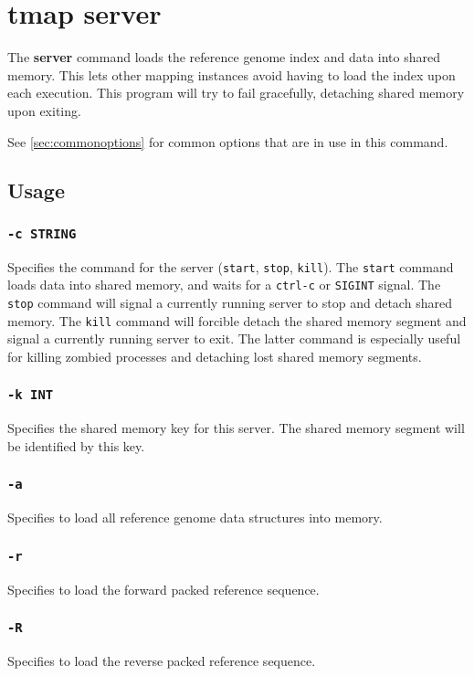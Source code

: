 \documentclass[a4paper,12pt]{book}
\newcommand{\TT}[1]{{\tt #1}} %
\newcommand{\BF}[1]{{\bf #1}} %
\begin{document}
\section{tmap server}
\label{sec:server}
The \BF{server} command loads the reference genome index and data into shared memory.
This lets other mapping instances avoid having to load the index upon each execution.
This program will try to fail gracefully, detaching shared memory upon exiting.

See \autoref{sec:commonoptions} for common options that are in use in this command.
\subsection{Usage}

\subsubsection{\TT{-c STRING}}
Specifies the command for the server (\TT{start}, \TT{stop}, \TT{kill}).
The \TT{start} command loads data into shared memory, and waits for a \TT{ctrl-c} or \TT{SIGINT} signal.
The \TT{stop} command will signal a currently running server to stop and detach shared memory.
The \TT{kill} command will forcible detach the shared memory segment and signal a currently running server to exit.
The latter command is especially useful for killing zombied processes and detaching lost shared memory segments.

\subsubsection{\TT{-k INT}}
Specifies the shared memory key for this server.
The shared memory segment will be identified by this key.

\subsubsection{\TT{-a}}
Specifies to load all reference genome data structures into memory.

\subsubsection{\TT{-r}}
Specifies to load the forward packed reference sequence.

\subsubsection{\TT{-R}}
Specifies to load the reverse packed reference sequence.
\end{document}
